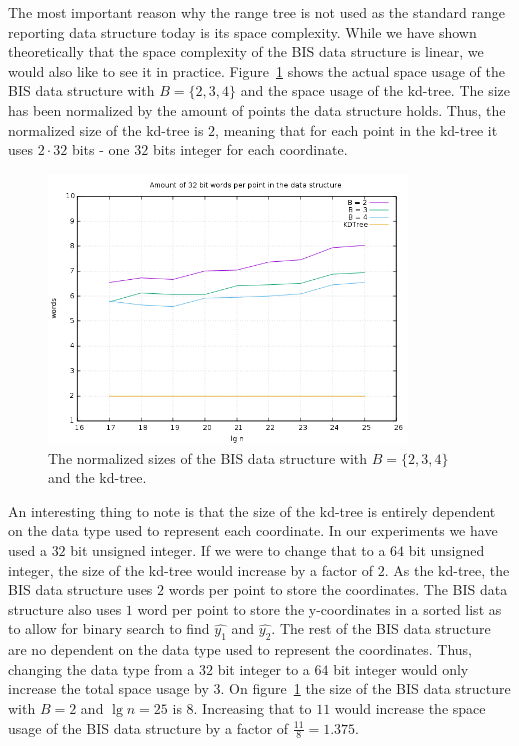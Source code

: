 The most important reason why the range tree is not used as the standard range reporting data structure today is its space complexity. While we have shown theoretically that the space complexity of the BIS data structure is linear, we would also like to see it in practice. Figure~\ref{fig:sizes} shows the actual space usage of the BIS data structure with $B=\{2,3,4\}$ and the space usage of the kd-tree. The size has been normalized by the amount of points the data structure holds. Thus, the normalized size of the kd-tree is $2$, meaning that for each point in the kd-tree it uses $2\cdot 32$ bits - one $32$ bits integer for each coordinate.

\begin{figure}[h]
    \centering
    \includegraphics[width = 0.85\textwidth]{pictures/analysis/sizes.png}
    \caption{The normalized sizes of the BIS data structure with $B=\{2,3,4\}$ and the kd-tree.}\label{fig:sizes}
\end{figure}
\clearpage


An interesting thing to note is that the size of the kd-tree is entirely dependent on the data type used to represent each coordinate. In our experiments we have used a $32$ bit unsigned integer. If we were to change that to a $64$ bit unsigned integer, the size of the kd-tree would increase by a factor of $2$. As the kd-tree, the BIS data structure uses $2$ words per point to store the coordinates. The BIS data structure also uses $1$ word per point to store the y-coordinates in a sorted list as to allow for binary search to find $\hat{y_1}$ and $\hat{y_2}$. The rest of the BIS data structure are no dependent on the data type used to represent the coordinates. Thus, changing the data type from a $32$ bit integer to a $64$ bit integer would only increase the total space usage by $3$. On figure~\ref{fig:sizes} the size of the BIS data structure with $B=2$ and $\lg n = 25$ is $8$. Increasing that to $11$ would increase the space usage of the BIS data structure by a factor of $\frac{11}{8} = 1.375$.


